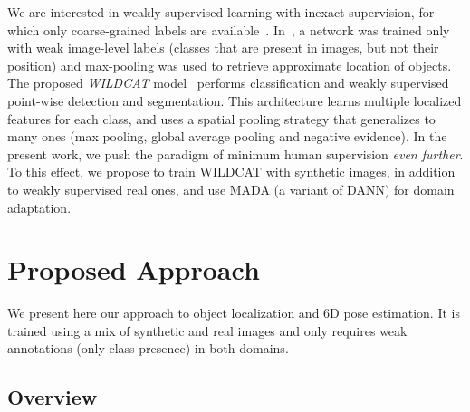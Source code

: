 \documentclass[letterpaper, 10 pt, conference]{ieeeconf}  %
\begin{document}
We are interested in weakly supervised learning with inexact supervision, for which only coarse-grained labels are available~\cite{zhou2017brief}. In~\cite{oquab2015object}, a network was trained only with weak image-level labels (classes that are present in images, but not their position) and max-pooling was used to retrieve approximate location of objects. The proposed {\it WILDCAT} model~\cite{durand2017wildcat} performs classification and weakly supervised point-wise detection and segmentation. This architecture learns multiple localized features for each class, and uses a spatial pooling strategy that generalizes to many ones (max pooling, global average pooling and negative evidence). In the present work, we push the paradigm of minimum human supervision \emph{even further}. To this effect, we propose to train WILDCAT with synthetic images, in addition to weakly supervised real ones, and use MADA (a variant of DANN) for domain adaptation.

\section{Proposed Approach}\label{sec:approach}
We present here our approach to object localization and 6D pose estimation. It is trained using a mix of synthetic and real images and only requires weak annotations (only class-presence) in both domains.

\vspace{-0.55cm}\subsection{Overview}%
\end{document}

